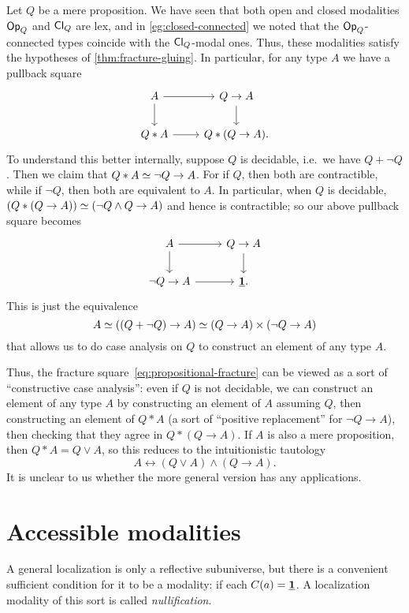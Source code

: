 \begin{eg}\label{eg:artin}
  Let $Q$ be a mere proposition.
  We have seen that both open and closed modalities $\mathsf{Op}_{Q}$ and $\mathsf{Cl}_{Q}$ are lex, and in \cref{eg:closed-connected} we noted that the $\mathsf{Op}_{Q}$-connected types coincide with the $\mathsf{Cl}_{Q}$-modal ones.
  Thus, these modalities satisfy the hypotheses of \cref{thm:fracture-gluing}.
  In particular, for any type $A$ we have a pullback square
  \begin{equation}
  \begin{tikzcd}
    A \ar[r] \ar[d] & Q\to A \ar[d] \\
    Q\ast A \ar[r] & Q\ast(Q\to A).
  \end{tikzcd}\label{eq:propositional-fracture}
  \end{equation}
  To understand this better internally, suppose $Q$ is decidable, i.e.\ we have $Q+\neg Q$.
  Then we claim that $\eqv{Q\ast A}{\neg Q \to A}$.
  For if $Q$, then both are contractible, while if $\neg Q$, then both are equivalent to $A$.
  In particular, when $Q$ is decidable, $\eqv{(Q\ast (Q\to A))}{(\neg Q \land Q \to A)}$ and hence is contractible; so our above pullback square becomes
  \[
  \begin{tikzcd}
    A \ar[r] \ar[d] & Q\to A \ar[d] \\
    \neg Q\to A \ar[r] & \unit.
  \end{tikzcd}
  \]
  This is just the equivalence
  \[A \simeq ((Q+\neg Q) \to A) \simeq (Q\to A) \times (\neg Q \to A) \]
  that allows us to do case analysis on $Q$ to construct an element of any type $A$.

  Thus, the fracture square~\eqref{eq:propositional-fracture} can be viewed as a sort of ``constructive case analysis'': even if $Q$ is not decidable, we can construct an element of any type $A$ by constructing an element of $A$ assuming $Q$, then constructing an element of $Q\ast A$ (a sort of ``positive replacement'' for $\neg Q \to A$), then checking that they agree in $Q\ast (Q\to A)$.
  If $A$ is also a mere proposition, then $Q\ast A = Q\lor A$, so this reduces to the intuitionistic tautology
  \[ A \leftrightarrow (Q\lor A) \land (Q\to A). \]
  It is unclear to us whether the more general version has any applications.
\end{eg}

\section{Accessible modalities}
A general localization is only a reflective subuniverse, but there is a convenient sufficient condition for it to be a modality: if each $C(a)=\underline{\mathbf{1}}$.
A localization modality of this sort is called \emph{nullification}.

